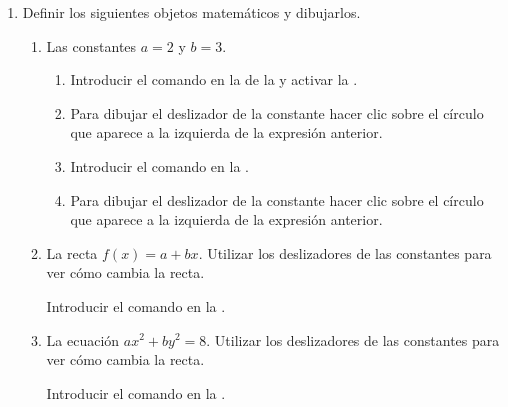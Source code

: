 \begin{enumerate}
\item Definir los siguientes objetos matemáticos y dibujarlos.
      \begin{enumerate}
      \item Las constantes $a=2$ y $b=3$.
            \begin{indication}
            \begin{enumerate}
            \item Introducir el comando  en la  de la  y activar la .
            \item Para dibujar el deslizador de la constante hacer clic sobre el círculo que aparece a la izquierda de la expresión anterior.
            \item Introducir el comando  en la .
            \item Para dibujar el deslizador de la constante hacer clic sobre el círculo que aparece a la izquierda de la expresión anterior.
            \end{enumerate}
            \end{indication}
      \item La recta $f(x)=a+bx$.
            Utilizar los deslizadores de las constantes para ver cómo cambia la recta.
            \begin{indication}
            Introducir el comando  en la .
            \end{indication}
      \item La ecuación $ax^2+by^2=8$.
            Utilizar los deslizadores de las constantes para ver cómo cambia la recta.
            \begin{indication}
            Introducir el comando  en la .
            \end{indication}
      \end{enumerate}


\end{enumerate}
